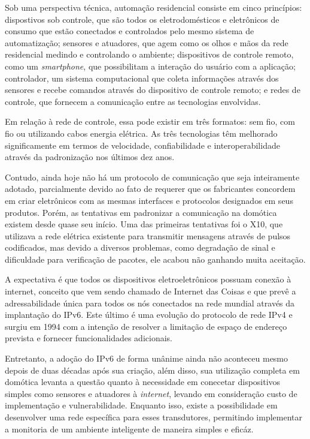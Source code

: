 \documentclass[
    12pt,               %
    a4paper,            %
    english,            %
    brazil,             %
    ]{article}
\begin{document}
Sob uma perspectiva técnica, automação residencial consiste em cinco princípios: dispostivos sob controle, que são todos os
eletrodomésticos e eletrônicos de consumo que estão conectados e controlados pelo mesmo sistema de automatização; sensores e
atuadores, que agem como os olhos e mãos da rede residencial medindo e controlando o ambiente; dispositivos de controle remoto,
como um \textit{smartphone}, que possibilitam a interação do usuário com a aplicação; controlador, um sistema computacional que
coleta informações através dos sensores e recebe comandos através do dispositivo de controle remoto; e redes de controle, que
fornecem a comunicação entre as tecnologias envolvidas. \cite{kyas2013}

Em relação à rede de controle, essa pode existir em três formatos: sem fio, com fio ou utilizando cabos energia elétrica. As três
tecnologias têm melhorado significamente em termos de velocidade, confiabilidade e interoperabilidade através da padronização nos
últimos dez anos. \cite{kyas2013}

Contudo, ainda hoje não há um protocolo de comunicação que seja inteiramente adotado, parcialmente devido ao fato de requerer que
os fabricantes concordem em criar eletrônicos com as mesmas interfaces e protocolos designados em seus produtos. Porém, as
tentativas em padronizar a comunicação na domótica existem desde quase seu início. Uma das primeiras tentativas foi o X10, que
utilizava a rede elétrica existente para transmitir mensagens através de pulsos codificados, mas devido a diversos problemas, como
degradação de sinal e dificuldade para verificação de pacotes, ele acabou não ganhando muita aceitação. \cite{riley2012}

A expectativa é que todos os dispositivos eletroeletrônicos possuam conexão à internet, conceito que vem sendo chamado de
Internet das Coisas e que prevê a adressabilidade única para todos os nós conectados na rede mundial através da implantação do
IPv6. Este último é uma evolução do protocolo de rede IPv4 e surgiu em 1994 com a intenção de resolver a limitação de espaço de
endereço prevista e fornecer funcionalidades adicionais. \cite{hagen2002}

Entretanto, a adoção do IPv6 de forma unânime ainda não aconteceu mesmo depois de duas décadas após sua criação, além disso, sua
utilização completa em domótica levanta a questão quanto à necessidade em conecetar dispositivos simples como sensores e atuadores
à \textit{internet}, levando em consideração custo de implementação e vulnerabilidade. Enquanto isso, existe a possibilidade em
desenvolver uma rede específica para esses transdutores, permitindo implementar a monitoria de um ambiente inteligente de maneira
simples e eficáz.
\end{document}
